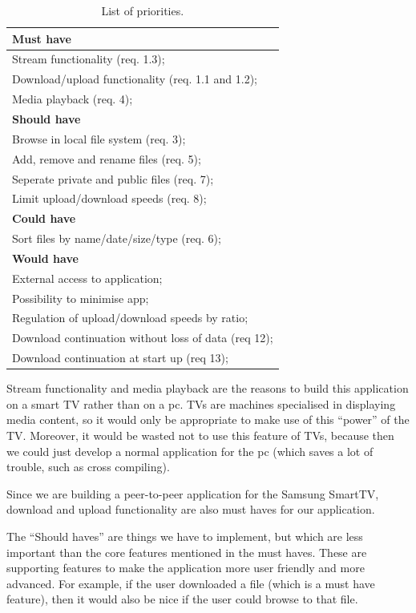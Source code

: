 \begin{table}[h!]
\centering
\begin{tabular}{|l|}
\hline
\textbf{Must have}\\ \hline
Stream functionality (req. 1.3); \\
Download/upload functionality (req. 1.1 and 1.2); \\
Media playback (req. 4); \\ \hline

\textbf{Should have}\\ \hline
Browse in local file system (req. 3); \\
Add, remove and rename files (req. 5); \\
Seperate private and public files (req. 7); \\
Limit upload/download speeds (req. 8); \\ \hline

\textbf{Could have}\\ \hline
Sort files by name/date/size/type (req. 6); \\ \hline

\textbf{Would have}\\ \hline
External access to application; \\
Possibility to minimise app; \\
Regulation of upload/download speeds by ratio; \\
Download continuation without loss of data (req 12); \\
Download continuation at start up (req 13); \\ \hline
\end{tabular}
\caption{List of priorities.}
\label{tab:MosCoW}
\end{table}

Stream functionality and media playback are the reasons to build this application on a smart 
TV rather than on a pc.
TV\textquotesingle s are machines specialised in displaying media content, so it would only 
be appropriate to make use of this ``power'' of the TV.
Moreover, it would be wasted not to use this feature of TV\textquotesingle s, because then we 
could just develop a normal application for the pc (which saves a lot of trouble, such as 
cross compiling).

Since we are building a peer-to-peer application for the Samsung SmartTV, download and upload 
functionality are also must haves for our application.

The ``Should haves'' are things we have to implement, but which are less important than the 
core features mentioned in the must haves. These are
supporting features to make the application more user friendly and more advanced. For 
example, if the user downloaded a file (which is a must have feature),
 then it would also be nice if the user could browse to that file.

